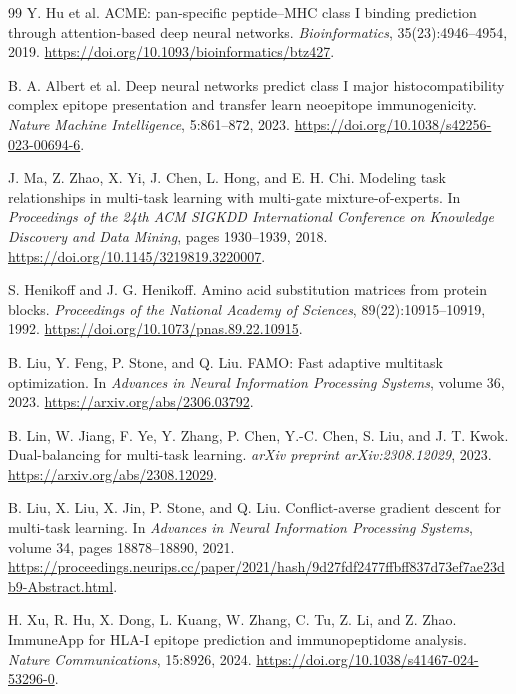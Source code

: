 \begin{thebibliography}{99}
Y. Hu et al.
\newblock ACME: pan-specific peptide--MHC class I binding prediction through attention-based deep neural networks.
\newblock \emph{Bioinformatics}, 35(23):4946--4954, 2019.
\newblock \url{https://doi.org/10.1093/bioinformatics/btz427}.

B. A. Albert et al.
\newblock Deep neural networks predict class I major histocompatibility complex epitope presentation and transfer learn neoepitope immunogenicity.
\newblock \emph{Nature Machine Intelligence}, 5:861--872, 2023.
\newblock \url{https://doi.org/10.1038/s42256-023-00694-6}.

J. Ma, Z. Zhao, X. Yi, J. Chen, L. Hong, and E. H. Chi.
\newblock Modeling task relationships in multi-task learning with multi-gate mixture-of-experts.
\newblock In \emph{Proceedings of the 24th ACM SIGKDD International Conference on Knowledge Discovery and Data Mining}, pages 1930--1939, 2018.
\newblock \url{https://doi.org/10.1145/3219819.3220007}.

S. Henikoff and J. G. Henikoff.
\newblock Amino acid substitution matrices from protein blocks.
\newblock \emph{Proceedings of the National Academy of Sciences}, 89(22):10915--10919, 1992.
\newblock \url{https://doi.org/10.1073/pnas.89.22.10915}.

B. Liu, Y. Feng, P. Stone, and Q. Liu.
\newblock FAMO: Fast adaptive multitask optimization.
\newblock In \emph{Advances in Neural Information Processing Systems}, volume 36, 2023.
\newblock \url{https://arxiv.org/abs/2306.03792}.

B. Lin, W. Jiang, F. Ye, Y. Zhang, P. Chen, Y.-C. Chen, S. Liu, and J. T. Kwok.
\newblock Dual-balancing for multi-task learning.
\newblock \emph{arXiv preprint arXiv:2308.12029}, 2023.
\newblock \url{https://arxiv.org/abs/2308.12029}.

B. Liu, X. Liu, X. Jin, P. Stone, and Q. Liu.
\newblock Conflict-averse gradient descent for multi-task learning.
\newblock In \emph{Advances in Neural Information Processing Systems}, volume 34, pages 18878--18890, 2021.
\newblock \url{https://proceedings.neurips.cc/paper/2021/hash/9d27fdf2477ffbff837d73ef7ae23db9-Abstract.html}.

H. Xu, R. Hu, X. Dong, L. Kuang, W. Zhang, C. Tu, Z. Li, and Z. Zhao.
\newblock ImmuneApp for HLA-I epitope prediction and immunopeptidome analysis.
\newblock \emph{Nature Communications}, 15:8926, 2024.
\newblock \url{https://doi.org/10.1038/s41467-024-53296-0}.


\end{thebibliography}

